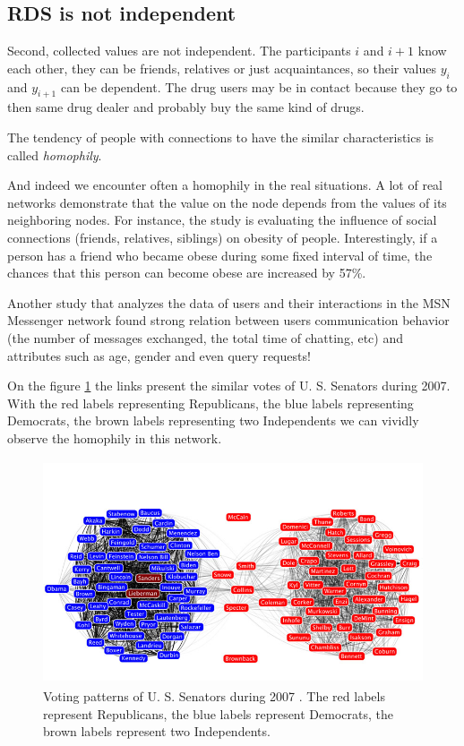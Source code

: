 \documentclass[12pt]{report}
\begin{document}
\subsection{RDS is not independent}
Second, collected values are not independent. The participants $i$ and $i+1$ know each other, they can be friends, relatives or just acquaintances, so their values $y_i$ and $y_{i+1}$ can be dependent. The drug users may be in contact because they go to then same drug dealer and probably buy the same kind of drugs. 

The tendency of people with connections to have the similar characteristics is called \textit{homophily}.

And indeed we encounter often a homophily in the real situations. A lot of real networks demonstrate that the value on the node depends from the values of its neighboring nodes. For instance, the study \cite{christakis2007spread} is evaluating the influence of social connections (friends, relatives, siblings) on obesity of people. Interestingly, if a person has a friend who became obese during some fixed interval of time, the chances that this person can become obese are increased by 57\%. 

Another study \cite{singla2008yes} that analyzes the data of users and their interactions in the MSN Messenger network found strong relation between users communication behavior (the number of messages exchanged, the total time of chatting, etc) and attributes such as age, gender and even query requests!

On the figure \ref{fig:senators} the links present the similar votes of U. S. Senators during 2007. With the red labels representing Republicans, the blue labels representing Democrats, the brown labels representing two Independents we can vividly observe the homophily in this network.


\begin{figure}[t]
    \centering
    \includegraphics[height = 250px]{senate}
    \caption{ Voting patterns of U. S. Senators during 2007 \cite{Senate}. The red labels represent Republicans, the blue labels represent Democrats, the brown labels represent two Independents.}
    \label{fig:senators}
\end{figure}
\end{document}
